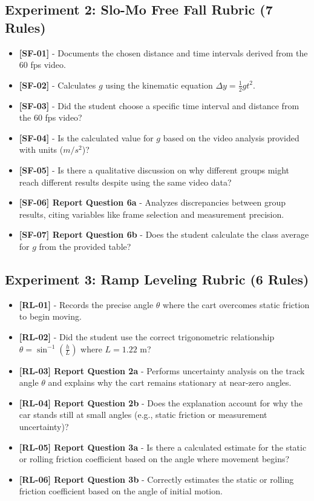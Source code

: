 \documentclass{article}
\begin{document}
\subsection*{Experiment 2: Slo-Mo Free Fall Rubric (7 Rules)}
\begin{itemize}
\item \textbf{ [SF-01] } - Documents the chosen distance and time intervals derived from the 60 fps video.
\item \textbf{ [SF-02] } - Calculates $g$ using the kinematic equation $\Delta y = \frac{1}{2}gt^2$.
\item \textbf{ [SF-03] } - Did the student choose a specific time interval and distance from the 60 fps video?
\item \textbf{ [SF-04] } - Is the calculated value for $g$ based on the video analysis provided with units ($m/s^2$)?
\item \textbf{ [SF-05] } - Is there a qualitative discussion on why different groups might reach different results despite using the same video data?    
\item \textbf{ [SF-06] Report Question 6a} - Analyzes discrepancies between group results, citing variables like frame selection and measurement precision.
\item \textbf{ [SF-07] Report Question 6b} - Does the student calculate the class average for $g$ from the provided table?
\end{itemize}

\subsection*{Experiment 3: Ramp Leveling Rubric (6 Rules)}
\begin{itemize}
\item \textbf{ [RL-01] } - Records the precise angle $\theta$ where the cart overcomes static friction to begin moving.
\item \textbf{ [RL-02] } - Did the student use the correct trigonometric relationship $\theta = \sin^{-1}(\frac{h}{L})$ where $L = 1.22$ m?
\item \textbf{ [RL-03] Report Question 2a } - Performs uncertainty analysis on the track angle $\theta$ and explains why the cart remains stationary at near-zero angles.    
\item \textbf{ [RL-04] Report Question 2b } - Does the explanation account for why the car stands still at small angles (e.g., static friction or measurement uncertainty)?
\item \textbf{ [RL-05] Report Question 3a } - Is there a calculated estimate for the static or rolling friction coefficient based on the angle where movement begins?
\item \textbf{ [RL-06] Report Question 3b } - Correctly estimates the static or rolling friction coefficient based on the angle of initial motion.
\end{itemize}
\end{document}

